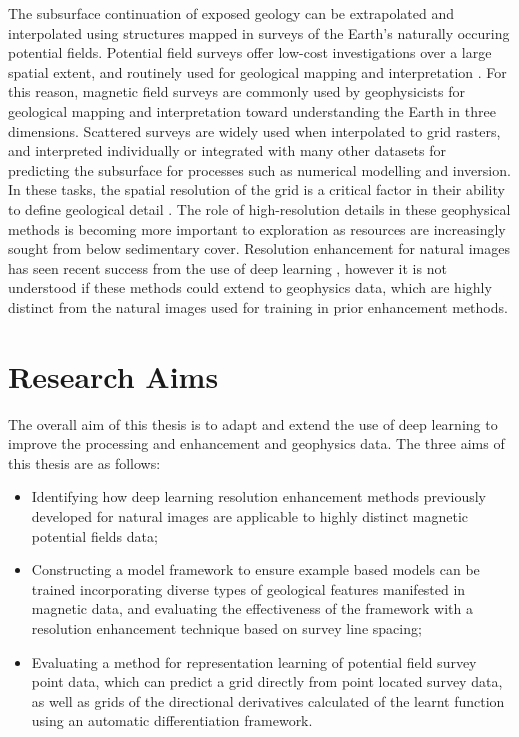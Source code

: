 % 
% 

The subsurface continuation of exposed geology can be extrapolated and interpolated using structures mapped in surveys of the Earth's naturally occuring potential fields.
Potential field surveys offer low-cost investigations over a large spatial extent, and routinely used for geological mapping and interpretation \parencite{nabighian75thAnniversaryHistorical2005}.
For this reason, magnetic field surveys are commonly used by geophysicists for geological mapping and interpretation toward understanding the Earth in three dimensions.
Scattered surveys are widely used when interpolated to grid rasters, and interpreted individually or integrated with many other datasets for predicting the subsurface for processes such as numerical modelling and inversion.
In these tasks, the spatial resolution of the grid is a critical factor in their ability to define geological detail \parencite{islesGeologicalInterpretationAeromagnetic2018}.
The role of high-resolution details in these geophysical methods is becoming more important to exploration as resources are increasingly sought from below sedimentary cover.
Resolution enhancement for natural images has seen recent success from the use of deep learning \parencite{moserHitchhikerGuideSuperResolution2023}, however it is not understood if these methods could extend to geophysics data, which are highly distinct from the natural images used for training in prior enhancement methods.

\section{Research Aims}
The overall aim of this thesis is to adapt and extend the use of deep learning to improve the processing and enhancement and geophysics data. The three aims of this thesis are as follows:

\begin{itemize}
    \item{} Identifying how deep learning resolution enhancement methods previously developed for natural images are applicable to highly distinct magnetic potential fields data;

    \item{} Constructing a model framework to ensure example based models can be trained incorporating diverse types of geological features manifested in magnetic data, and evaluating the effectiveness of the framework with a resolution enhancement technique based on survey line spacing;

    \item{} Evaluating a method for representation learning of potential field survey point data, which can predict a grid directly from point located survey data, as well as grids of the directional derivatives calculated of the learnt function using an automatic differentiation framework.
\end{itemize}

